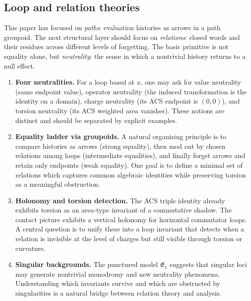 \subsection{Loop and relation theories}\label{subsec:outlook-loops}

This paper has focused on \emph{paths}: evaluation histories as arrows in a path groupoid. The next structural layer should focus on \emph{relations}: closed words and their residues across different levels of forgetting. The basic primitive is not equality alone, but \emph{neutrality}: the sense in which a nontrivial history returns to a null effect.

\begin{enumerate}
    \item \textbf{Four neutralities.} For a loop based at $x$, one may ask for value neutrality (same endpoint value), operator neutrality (the induced transformation is the identity on a domain), charge neutrality (its ACS endpoint is $(0,0)$), and torsion neutrality (its ACS weighted area vanishes). These notions are distinct and should be separated by explicit examples.
    \item \textbf{Equality ladder via groupoids.} A natural organizing principle is to compare histories as arrows (strong equality), then mod out by chosen relations among loops (intermediate equalities), and finally forget arrows and retain only endpoints (weak equality). One goal is to define a minimal set of relations which captures common algebraic identities while preserving torsion as a meaningful obstruction.
    \item \textbf{Holonomy and torsion detection.} The ACS triple identity already exhibits torsion as an area-type invariant of a commutative shadow. The contact picture exhibits a vertical holonomy for horizontal commutator loops. A central question is to unify these into a loop invariant that detects when a relation is invisible at the level of charges but still visible through torsion or curvature.
    \item \textbf{Singular backgrounds.} The punctured model $\mathfrak{E}_1$ suggests that singular loci may generate nontrivial monodromy and new neutrality phenomena. Understanding which invariants survive and which are obstructed by singularities is a natural bridge between relation theory and analysis.
\end{enumerate}

